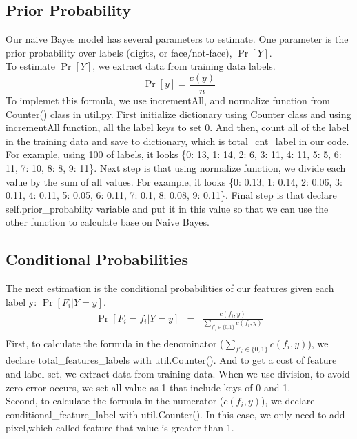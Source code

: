 \documentclass{article}
\begin{document}
    \subsection{Prior Probability}
        Our naive Bayes model has several parameters to estimate. One parameter is the prior probability over labels (digits, or face/not-face), $\Pr[Y]$.\\
        To estimate $\Pr[Y]$, we extract data from training data labels. 
        \begin{displaymath}
        \Pr[y] = \frac{c(y)}{n}
        \end{displaymath}
        To implemet this formula, we use incrementAll, and normalize function from Counter() class in util.py. First initialize dictionary using Counter class and using incrementAll function, all the label keys to set 0. And then, count all of the label in the training data and save to dictionary, which is total\_cnt\_label in our code. For example, using 100 of labels, it looks \{0: 13, 1: 14, 2: 6, 3: 11, 4: 11, 5: 5, 6: 11, 7: 10, 8: 8, 9: 11\}. Next step is that using normalize function, we divide each value by the sum of all values. For example, it looks \{0: 0.13, 1: 0.14, 2: 0.06, 3: 0.11, 4: 0.11, 5: 0.05, 6: 0.11, 7: 0.1, 8: 0.08, 9: 0.11\}.
        Final step is that declare self.prior\_probabilty variable and put it in this value so that we can use the other function to calculate base on Naive Bayes. 

    \subsection{Conditional Probabilities}
        The next estimation is the conditional probabilities of our features given each label y: $\Pr[F_i \vert Y = y]$.
        \begin{eqnarray*}
        \Pr[F_i=f_i\vert Y=y] &=& \frac{c(f_i,y)}{\sum_{f'_i\in \{0,1\}}{c(f_i,y)}} \\
        \end{eqnarray*}
        First, to calculate the formula in the denominator (${\sum_{f'_i\in \{0,1\}}{c(f_i,y)}}$), we declare total\_features\_labels with util.Counter(). And to get a cost of feature and label set, we extract data from training data. When we use division, to avoid zero error occurs, we set all value as 1 that include keys of 0 and 1.\\ 
        Second, to calculate the formula in the numerator ($c(f_i,y)$), we declare conditional\_feature\_label with util.Counter(). In this case, we only need to add pixel,which called feature that value is greater than 1. 
        
\end{document}
